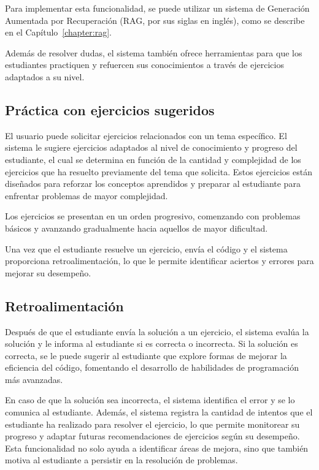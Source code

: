 \documentclass{article}
\begin{document}
Para implementar esta funcionalidad, se puede utilizar un sistema de Generación Aumentada por Recuperación (RAG, por sus siglas en inglés), como se describe en el Capítulo~\ref{chapter:rag}. 

Además de resolver dudas, el sistema también ofrece herramientas para que los estudiantes practiquen y refuercen sus conocimientos a través de ejercicios adaptados a su nivel.

\subsection{Práctica con ejercicios sugeridos}

El usuario puede solicitar ejercicios relacionados con un tema específico. El sistema le sugiere ejercicios adaptados al nivel de conocimiento y progreso del estudiante, el cual se determina en función de la cantidad y complejidad de los ejercicios que ha resuelto previamente del tema que solicita. Estos ejercicios están diseñados para reforzar los conceptos aprendidos y preparar al estudiante para enfrentar problemas de mayor complejidad.

Los ejercicios se presentan en un orden progresivo, comenzando con problemas básicos y avanzando gradualmente hacia aquellos de mayor dificultad.

Una vez que el estudiante resuelve un ejercicio, envía el código y el sistema proporciona retroalimentación, lo que le permite identificar aciertos y errores para mejorar su desempeño.

\subsection{Retroalimentación}

Después de que el estudiante envía la solución a un ejercicio, el sistema evalúa la solución y le informa al estudiante si es correcta o incorrecta. Si la solución es correcta, se le puede sugerir al estudiante que explore formas de mejorar la eficiencia del código, fomentando el desarrollo de habilidades de programación más avanzadas.

En caso de que la solución sea incorrecta, el sistema identifica el error y se lo comunica al estudiante. Además, el sistema registra la cantidad de intentos que el estudiante ha realizado para resolver el ejercicio, lo que permite monitorear su progreso y adaptar futuras recomendaciones de ejercicios según su desempeño. Esta funcionalidad no solo ayuda a identificar áreas de mejora, sino que también motiva al estudiante a persistir en la resolución de problemas.
\end{document}
